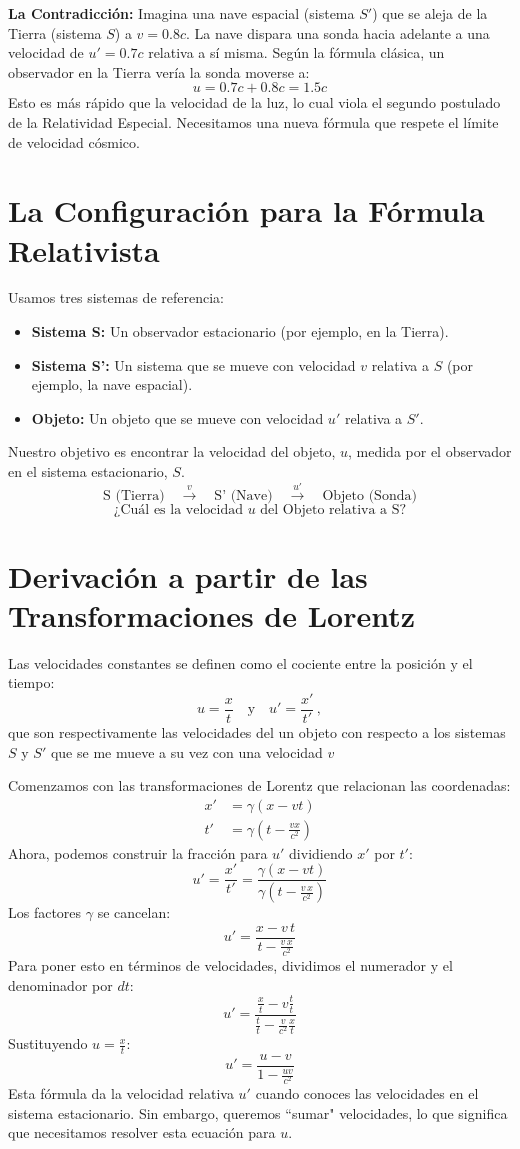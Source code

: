 \documentclass[11pt,a4paper]{article}
\begin{document}
\textbf{La Contradicción:} Imagina una nave espacial (sistema $S'$) que se aleja de la Tierra (sistema $S$) a $v=0.8c$. La nave dispara una sonda hacia adelante a una velocidad de $u'=0.7c$ relativa a sí misma. Según la fórmula clásica, un observador en la Tierra vería la sonda moverse a:
\[ u = 0.7c + 0.8c = 1.5c \]
Esto es más rápido que la velocidad de la luz, lo cual viola el segundo postulado de la Relatividad Especial. Necesitamos una nueva fórmula que respete el límite de velocidad cósmico.

\section{La Configuración para la Fórmula Relativista}

Usamos tres sistemas de referencia:
\begin{itemize}
    \item \textbf{Sistema S:} Un observador estacionario (por ejemplo, en la Tierra).
    \item \textbf{Sistema S':} Un sistema que se mueve con velocidad $v$ relativa a $S$ (por ejemplo, la nave espacial).
    \item \textbf{Objeto:} Un objeto que se mueve con velocidad $u'$ relativa a $S'$.
\end{itemize}
Nuestro objetivo es encontrar la velocidad del objeto, \textbf{$u$}, medida por el observador en el sistema estacionario, $S$.
\[
\text{S (Tierra)} \quad \xrightarrow{v} \quad \text{S' (Nave)} \quad \xrightarrow{u'} \quad \text{Objeto (Sonda)}
\]
\[
\text{¿Cuál es la velocidad } u \text{ del Objeto relativa a S?}
\]

\section{Derivación a partir de las Transformaciones de Lorentz}

Las velocidades constantes se definen como el cociente entre la posición y el tiempo:
\[ u = \frac{x}{t} \quad \text{y} \quad u' = \frac{x'}{t'}\,, \]
que son respectivamente las velocidades del un objeto con respecto a los sistemas $S$ y $S'$ que se me mueve a su vez con una velocidad $v$

Comenzamos con las transformaciones de Lorentz que relacionan las coordenadas:
\begin{align*}
x' &= \gamma(x - vt) \\
t' &= \gamma\left(t - \frac{vx}{c^2}\right)
\end{align*}
Ahora, podemos construir la fracción para $u'$ dividiendo $x'$ por $t'$:
\[ u' = \frac{x'}{t'} = \frac{\gamma(x - vt)}{\gamma\left(t - \frac{v\,x}{c^2}\right)} \]
Los factores $\gamma$ se cancelan:
\[ u' = \frac{x - v\,t}{t - \frac{v\,x}{c^2}} \]
Para poner esto en términos de velocidades, dividimos el numerador y el denominador por $dt$:
\[ u' = \frac{\frac{x}{t} - v\frac{t}{t}}{\frac{t}{t} - \frac{v}{c^2}\frac{x}{t}} \]
Sustituyendo $u = \frac{x}{t}$:
\[ u' = \frac{u - v}{1 - \frac{uv}{c^2}} \]
Esta fórmula da la velocidad relativa $u'$ cuando conoces las velocidades en el sistema estacionario. Sin embargo, queremos ``sumar" velocidades, lo que significa que necesitamos resolver esta ecuación para $u$.
\end{document}
